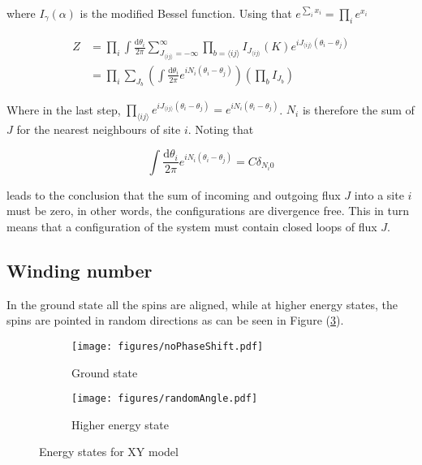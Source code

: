 where $I_\gamma(\alpha)$ is the modified Bessel function. Using that $e^{\sum_i x_i} = \prod_i e^{x_i}$

\begin{align}
    Z &= \prod_i \int \frac{\mathrm d \theta_i}{2 \pi} \sum_{J_{\langle ij \rangle} = -\infty}^{\infty} \prod_{b = \langle ij \rangle} I_{J_{\langle ij \rangle}} ( K ) e^{i J_{\langle ij \rangle} (\theta_i - \theta_j)} \\
\label{eq:xypart2}
% 
    &=  \prod_i \sum_{J_b} \left ( \int \frac{\mathrm d \theta_i}{2 \pi} e^{i N_i (\theta_i - \theta_j)} \right ) \left ( \prod_b I_{J_b} \right ) 
\end{align}

Where in the last step, $\prod_{\langle ij \rangle} e^{iJ_{\langle ij \rangle} (\theta_i - \theta_j)} = e^{iN_i (\theta_i - \theta_j)}$. $N_i$ is therefore the sum of $J$ for the nearest neighbours of site $i$. Noting that

\begin{equation}
    \int \frac{\mathrm d \theta_i}{2 \pi} e^{i N_i (\theta_i - \theta_j)} = C \delta_{N_i 0}
\end{equation}

leads to the conclusion that the sum of incoming and outgoing flux $J$ into a site $i$ must be zero, in other words, the configurations are divergence free. This in turn means that a configuration of the system must contain closed loops of flux $J$.


\subsection{Winding number}
\label{subsec:XYWindingNum}

In the ground state all the spins are aligned, while at higher energy states, the spins are pointed in random directions as can be seen in Figure (\ref{fig:xygroundhigher}).

\begin{figure}[h!]
\centering
    \begin{subfigure}{.4\textwidth}
        \centering
        \texttt{[image: figures/noPhaseShift.pdf]}
        \caption{Ground state}
        \label{fig:xyground}
    \end{subfigure}
    \begin{subfigure}{.4\textwidth}
        \centering
        \texttt{[image: figures/randomAngle.pdf]}
        \caption{Higher energy state}
        \label{fig:xyhigher}
    \end{subfigure}
    \caption{Energy states for XY model}
\label{fig:xygroundhigher}
\end{figure}

